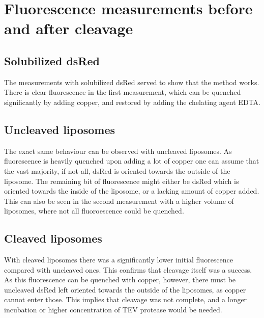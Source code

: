 \section{Fluorescence measurements before and after cleavage}

\subsection{Solubilized dsRed}

The measurements with solubilized dsRed served to show that the method works.
There is clear fluorescence in the first measurement, which can be quenched
significantly by adding copper, and restored by adding the chelating agent
EDTA.

\subsection{Uncleaved liposomes}

The exact same behaviour can be observed with uncleaved liposomes. As
fluorescence is heavily quenched upon adding a lot of copper one can assume
that the vast majority, if not all, dsRed is oriented towards the outside of
the liposome. The remaining bit of fluorescence might either be dsRed which is
oriented towards the inside of the liposome, or a lacking amount of copper
added. This can also be seen in the second measurement with a higher volume of
liposomes, where not all fluoroescence could be quenched.

\subsection{Cleaved liposomes}

With cleaved liposomes there was a significantly lower initial fluorescence
compared with uncleaved ones. This confirms that cleavage itself was a success.
As this fluorescence can be quenched with copper, however, there must be
uncleaved dsRed left oriented towards the outside of the liposomes, as copper
cannot enter those. This implies that cleavage was not complete, and a longer
incubation or higher concentration of TEV protease would be needed.
